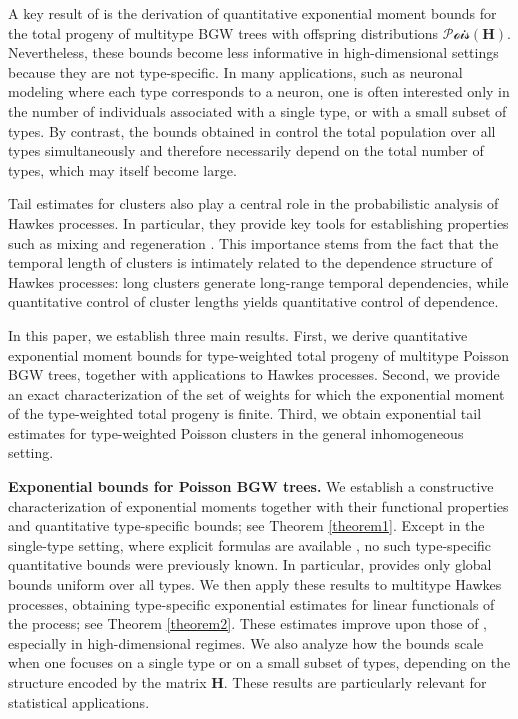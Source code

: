 \documentclass[reqno,final,11pt]{amsart}
\renewcommand{\cite}{\citet}
\theoremstyle{plain}
\theoremstyle{definition}
\theoremstyle{remark}
\renewcommand{\H}{\bm{H}}
\newcommand{\Pois}{\mathscr{P}\!\mathscr{o}\!\mathscr{i}\!\mathscr{s}}
\begin{document}
A key result of \cite{leblanc_exponential_2024} is the derivation of quantitative exponential moment bounds for the total progeny of multitype BGW trees with offspring distributions $\Pois(\H)$. Nevertheless, these bounds become less informative in high-dimensional settings because they are not type-specific. In many applications, such as neuronal modeling where each type corresponds to a neuron, one is often interested only in the number of individuals associated with a single type, or with a small subset of types. By contrast, the bounds obtained in \cite{leblanc_exponential_2024} control the total population over all types simultaneously and therefore necessarily depend on the total number of types, which may itself become large.

Tail estimates for clusters also play a central role in the probabilistic analysis of Hawkes processes. In particular, they provide key tools for establishing properties such as mixing \cite{boly_mixing_2023} and regeneration \cite{graham_regenerative_2021}. This importance stems from the fact that the temporal length of clusters is intimately related to the dependence structure of Hawkes processes: long clusters generate long-range temporal dependencies, while quantitative control of cluster lengths yields quantitative control of dependence.

In this paper, we establish three main results. First, we derive quantitative exponential moment bounds for type-weighted total progeny of multitype Poisson BGW trees, together with applications to Hawkes processes. Second, we provide an exact characterization of the set of weights for which the exponential moment of the type-weighted total progeny is finite. Third, we obtain exponential tail estimates for type-weighted Poisson clusters in the general inhomogeneous setting.

\textbf{Exponential bounds for Poisson BGW trees.}
We establish a constructive characterization of exponential moments together with their functional properties and quantitative type-specific bounds; see Theorem \ref{theorem1}. Except in the single-type setting, where explicit formulas are available \cite{bordenave_large_2007}, no such type-specific quantitative bounds were previously known. In particular, \cite{leblanc_exponential_2024} provides only global bounds uniform over all types. We then apply these results to multitype Hawkes processes, obtaining type-specific exponential estimates for linear functionals of the process; see Theorem \ref{theorem2}. These estimates improve upon those of \cite{leblanc_exponential_2024}, especially in high-dimensional regimes. We also analyze how the bounds scale when one focuses on a single type or on a small subset of types, depending on the structure encoded by the matrix $\H$. These results are particularly relevant for statistical applications.
\end{document}
